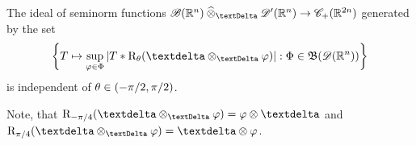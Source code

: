 \begin{lemma}
    The ideal of seminorm functions
    $ \fsSmobnd( \nrR^n ) \cteproDi \fsDis( \nrR^n ) \to \fsCntp( \nrR^{2n} ) $
    generated by the set
    \begin{align}
        \BrmSet{ T \mto \sup_{\ph\in\Ph}\Abs{ T * \rmR_\th( \sfdeo \teproDi \ph ) } }
        { \Ph \in \ssBnd( \fsTest( \nrR^n ) ) }
    \end{align}
    is independent of $ \theta \in (-\pi/2,\pi/2) $.
\end{lemma}

\begin{remark}
    Note, that $ \rmR_{-\pi/4}( \sfdeo \teproDi \ph ) = \ph \tepro \sfdeo $
    and $ \rmR_{\pi/4}( \sfdeo \teproDi \ph ) = \sfdeo \tepro \ph $.
\end{remark}